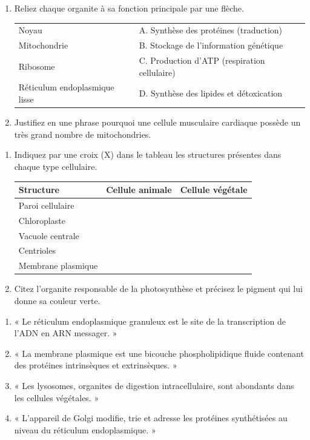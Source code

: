 \documentclass[11pt]{article}
\begin{document}
\begin{exercice}
\begin{enumerate}
    \item Reliez chaque organite à sa fonction principale par une flèche.
    \begin{tabular}{ll}
    Noyau & \quad A. Synthèse des protéines (traduction) \\
    Mitochondrie & \quad B. Stockage de l'information génétique \\
    Ribosome & \quad C. Production d'ATP (respiration cellulaire) \\
    Réticulum endoplasmique lisse & \quad D. Synthèse des lipides et détoxication
    \end{tabular}
    \item Justifiez en une phrase pourquoi une cellule musculaire cardiaque possède un très grand nombre de mitochondries.
\end{enumerate}
\end{exercice}

\begin{exercice}
\begin{enumerate}
    \item Indiquez par une croix (X) dans le tableau les structures présentes dans chaque type cellulaire.
    \begin{tabular}{|l|c|c|}
    \hline
    \textbf{Structure} & \textbf{Cellule animale} & \textbf{Cellule végétale} \\ \hline
    Paroi cellulaire & & \\ \hline
    Chloroplaste & & \\ \hline
    Vacuole centrale & & \\ \hline
    Centrioles & & \\ \hline
    Membrane plasmique & & \\ \hline
    \end{tabular}
    \item Citez l'organite responsable de la photosynthèse et précisez le pigment qui lui donne sa couleur verte.
\end{enumerate}
\end{exercice}

\begin{exercice}
\begin{enumerate}
    \item « Le réticulum endoplasmique granuleux est le site de la transcription de l'ADN en ARN messager. »
    \item « La membrane plasmique est une bicouche phospholipidique fluide contenant des protéines intrinsèques et extrinsèques. »
    \item « Les lysosomes, organites de digestion intracellulaire, sont abondants dans les cellules végétales. »
    \item « L'appareil de Golgi modifie, trie et adresse les protéines synthétisées au niveau du réticulum endoplasmique. »
\end{enumerate}
\end{exercice}
\end{document}
